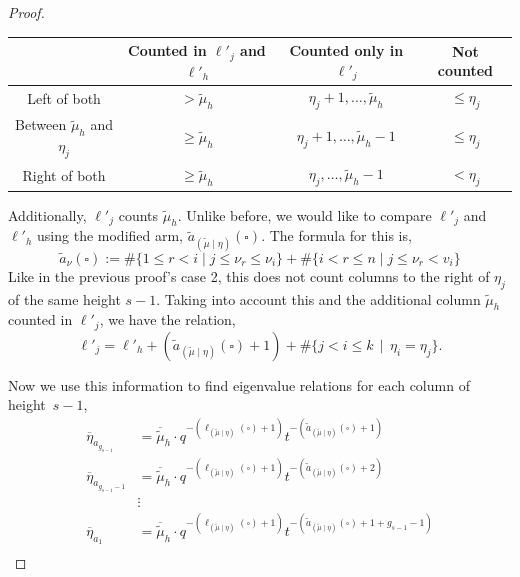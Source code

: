 \documentclass[ALCO]{cedram}
\newcommand{\mutilde}{{\widetilde{\mu}}}
\newcommand{\mutildeeta}{{(\mutilde \mid \eta)}}
\newcommand{\leg}[1]{{\ell_{#1}(\square)}}
\newcommand{\armone}[1]{{\widetilde{a}_{#1}(\square)}}
\newcommand{\lj}{\ell'_j}
\newcommand{\lh}{\ell'_h}
\begin{document}
\begin{proof}
\begin{center}\begin{tabular}{|c|c|c|c|}
     \hline
     & Counted in $\lj$ and $\lh$ & Counted only in $\lj$ & Not counted   \\ \hline
     Left of both & $>\mutilde_h$ & $\eta_j+1, \dotsc, \mutilde_h $ & $\leq \eta_j$\\ \hline
     Between $\mutilde_h$ and $\eta_j$ & $\geq \mutilde_h$ & $\eta_j+1,\dotsc, \mutilde_h-1$ & $\leq \eta_j$\\ \hline 
     Right of both & $\geq \mutilde_h$ & $\eta_j, \dotsc, \mutilde_h-1$ & $<\eta_j$ \\ \hline 
\end{tabular}
\end{center}

Additionally, $\lj$ counts $\mutilde_h$. Unlike before, we would like to compare $\lj$ and $\lh$ using the modified arm, $\armone{\mutildeeta}$. The formula for this is,
\[\armone{\nu} := \# \{1\leq r < i \mid j \leq \nu_r \leq \nu_i \} + \# \{i<r \leq n \mid j \leq \nu_r < v_i \}\]
Like in the previous proof's case 2, this does not count columns to the right of $\eta_j$ of the same height $s-1$. Taking into account this and the additional column $\mutilde_h$ counted in $\lj$, we have the relation,
\[ \lj =\lh + (\armone{\mutildeeta}+1)+\# \{ j < i \leq k \, \mid \, \eta_i = \eta_j \}.\]

Now we use this information to find eigenvalue relations for each column of height~$s-1$,
\begin{align*}
    \overline{\eta}_{a_{g_{s-1}}} &= \overline{\mutilde}_h \cdot q^{-(\leg{\mutildeeta}+1)}t^{-(\armone{\mutildeeta}+1)}\\
     \overline{\eta}_{a_{g_{s-1}-1}} &= \overline{\mutilde}_h \cdot q^{-(\leg{\mutildeeta}+1)}t^{-(\armone{\mutildeeta}+2)}\\
     &\vdots \\
      \overline{\eta}_{a_1} &= \overline{\mutilde}_h \cdot q^{-(\leg{\mutildeeta}+1)}t^{-(\armone{\mutildeeta}+1+g_{s-1}-1)}\\
\end{align*}


\end{proof}
\end{document}
